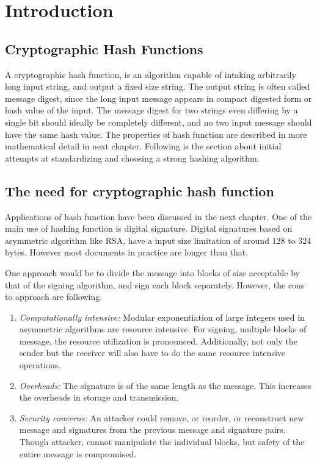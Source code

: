 \chapter{Introduction}

\section{Cryptographic Hash Functions}

A cryptographic hash function, is an algorithm capable of intaking arbitrarily long input string, and
output a fixed size string. The output string is often called message digest, since the long input
message appears in compact digested form or hash value of the input. The message digest for two strings
even differing by a single bit should ideally be completely different, and no two input message should
have the same hash value. The properties of hash function are described in more mathematical detail in
next chapter. Following is the section about initial attempts at standardizing and choosing a strong
hashing algorithm.

\section{The need for cryptographic hash function} 

Applications of hash function have been discussed in the next chapter. One of the main
use of hashing function is digital signature. Digital signatures based on asymmetric algorithm like
RSA, have a input size limitation of around 128 to 324 bytes. However most documents in practice are
longer than that. \cite{00017}

One approach would be to divide the message into blocks of size acceptable by that of the signing 
algorithm, and sign each block separately. However, the cons to approach are following.

\begin{enumerate}
  \item \emph{Computationally intensive:} Modular exponentiation of large integers used in asymmetric
  algorithms are resource intensive. For signing, multiple blocks of message, the resource utilization
  is pronounced. Additionally, not only the sender but the receiver will also have to do the same resource
  intensive operations.
  \item \emph{Overheads:} The signature is of the same length as the message. This increases the overheads
  in storage and transmission.
  \item \emph{Security concerns:} An attacker could remove, or reorder, or reconstruct new message and 
  signatures from the previous message and signature pairs. Though attacker, cannot manipulate the individual
  blocks, but safety of the entire message is compromised.
\end{enumerate}

